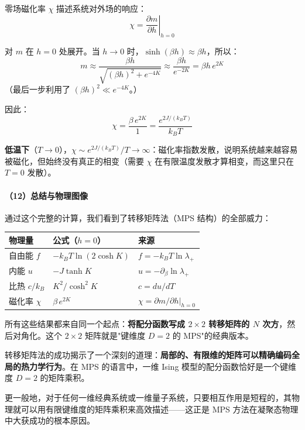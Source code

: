 \documentclass[12pt,a4paper]{ctexart}
\begin{document}
零场磁化率 $\chi$ 描述系统对外场的响应：
\[
\chi = \left.\frac{\partial m}{\partial h}\right|_{h=0}
\]

对 $m$ 在 $h=0$ 处展开。当 $h\to 0$ 时，$\sinh(\beta h) \approx \beta h$，所以：
\[
m \approx \frac{\beta h}{\sqrt{(\beta h)^2 + e^{-4K}}} \approx \frac{\beta h}{e^{-2K}} = \beta h \, e^{2K}
\]
（最后一步利用了 $(\beta h)^2 \ll e^{-4K}$。）

因此：
\begin{equation}
\boxed{
\chi = \frac{\beta \, e^{2K}}{1} = \frac{e^{2J/(k_BT)}}{k_BT}
}
\end{equation}

\textbf{低温下}（$T \to 0$），$\chi \sim e^{2J/(k_BT)}/T \to \infty$：磁化率指数发散，说明系统越来越容易被磁化，但始终没有真正的相变（需要 $\chi$ 在有限温度发散才算相变，而这里只在 $T=0$ 发散）。

\paragraph{（12）总结与物理图像}

通过这个完整的计算，我们看到了转移矩阵法（MPS 结构）的全部威力：

\begin{center}
\renewcommand{\arraystretch}{1.3}
\begin{tabular}{lll}
\hline
\textbf{物理量} & \textbf{公式（$h=0$）} & \textbf{来源} \\
\hline
自由能 $f$ & $-k_BT\ln(2\cosh K)$ & $f = -k_BT \ln\lambda_+$ \\
内能 $u$ & $-J\tanh K$ & $u = -\partial_\beta \ln\lambda_+$ \\
比热 $c/k_B$ & $K^2/\cosh^2 K$ & $c = du/dT$ \\
磁化率 $\chi$ & $\beta \, e^{2K}$ & $\chi = \partial m/\partial h\big|_{h=0}$ \\
\hline
\end{tabular}
\end{center}

所有这些结果都来自同一个起点：\textbf{将配分函数写成 $2 \times 2$ 转移矩阵的 $N$ 次方}，然后对角化。这个 $2 \times 2$ 矩阵就是"键维度 $D=2$ 的 MPS"的经典版本。

\begin{tcolorbox}[colback=blue!5!white, colframe=blue!60!black, title=MPS视角的核心启示]
转移矩阵法的成功揭示了一个深刻的道理：\textbf{局部的、有限维的矩阵可以精确编码全局的热力学行为}。在 MPS 的语言中，一维 Ising 模型的配分函数恰好是一个键维度 $D=2$ 的矩阵乘积。

更一般地，对于任何一维经典系统或一维量子系统，只要相互作用是短程的，其物理就可以用有限键维度的矩阵乘积来高效描述——这正是 MPS 方法在凝聚态物理中大获成功的根本原因。
\end{tcolorbox}
\end{document}
